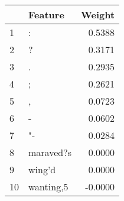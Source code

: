 \begin{tabular}{llr}
\toprule
{} &    Feature &  Weight \\
\midrule
1  &          : &  0.5388 \\
2  &          ? &  0.3171 \\
3  &          . &  0.2935 \\
4  &          ; &  0.2621 \\
5  &          , &  0.0723 \\
6  &          - &  0.0602 \\
7  &         "- &  0.0284 \\
8  &  maraved?s &  0.0000 \\
9  &     wing'd &  0.0000 \\
10 &  wanting,5 & -0.0000 \\
\bottomrule
\end{tabular}
